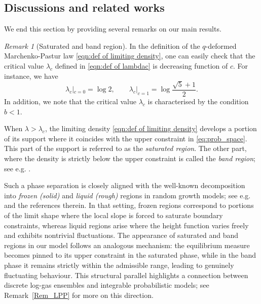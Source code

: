 \documentclass{amsart}
\theoremstyle{plain}
\theoremstyle{remark}
\newtheorem{rem}{Remark}
\numberwithin{equation}{section}
\begin{document}
\subsection{Discussions and related works}

We end this section by providing several remarks on our main results.

\begin{rem}[Saturated and band region]
In the definition of the $q$-deformed Marchenko-Pastur law \eqref{eqn:def of limiting density}, one can easily check that the critical value $\lambda_c$ defined in \eqref{eqn:def of lambdac} is decreasing function of $c$. For instance, we have 
\begin{equation}
\lambda_c|_{c=0} = \log 2, \qquad  \lambda_c|_{c=1} = \log \frac{ \sqrt{5}+1 }{2}.  
\end{equation}
In addition, we note that the critical value $\lambda_c$ is characterised by the condition $b<1$.

When $\lambda > \lambda_c$, the limiting density \eqref{eqn:def of limiting density} develops a portion of its support where it coincides with the upper constraint in \eqref{eq:prob_space}. This part of the support is referred to as the \emph{saturated region}. The other part, where the density is strictly below the upper constraint is called the \emph{band region}; see e.g. \cite{BKMM}. 

Such a phase separation is closely aligned with the well-known decomposition into \textit{frozen (solid)} and \textit{liquid (rough)} regions in random growth models; see e.g. \cite{BCG16,DK21,CC25} and the references therein. 
In that setting, frozen regions correspond to portions of the limit shape where the local slope is forced to saturate boundary constraints, whereas liquid regions arise where the height function varies freely and exhibits nontrivial fluctuations.
The appearance of saturated and band regions in our model follows an analogous mechanism: the equilibrium measure becomes pinned to its upper constraint in the saturated phase, while in the band phase it remains strictly within the admissible range, leading to genuinely fluctuating behaviour. This structural parallel highlights a connection between discrete log-gas ensembles and integrable probabilistic models; see Remark~\ref{Rem_LPP} for more on this direction.
\end{rem} 
\end{document}
